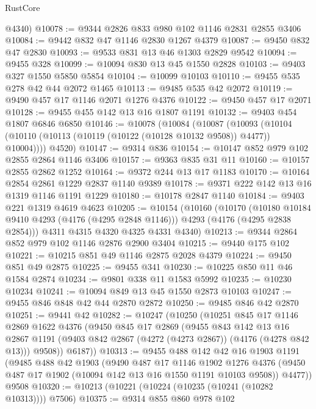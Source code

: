 \begin{lexlean}{RustCore}
\begin{coremodule}
      @4340)
@10078 := @9344 @2826 @833 @980 @102 @1146 @2831 @2855 @3406
@10084 := @9442 @832 @47 @1146 @2830 @1267 @4379
@10087 := @9450 @832 @47 @2830
@10093 := @9533 @831 @13 @46 @1303 @2829 @9542
@10094 := @9455 @328
@10099 := @10094 @830 @13 @45 @1550 @2828
@10103 := @9403 @327 @1550 @5850 @5854
@10104 := @10099 @10103
@10110 := @9455 @535 @278 @42 @44 @2072 @1465
@10113 := @9485 @535 @42 @2072
@10119 := @9490 @457 @17 @1146 @2071 @1276 @4376
@10122 := @9450 @457 @17 @2071
@10128 := @9455 @455 @142 @13 @16 @1807 @1191
@10132 := @9403 @454 @1807 @6846 @6850
@10146 := @10078
    (@10084
      (@10087
        (@10093 (@10104 (@10110 (@10113 (@10119 (@10122 (@10128 @10132 @9508)) @4477)) @10004))))
      @4520)
@10147 := @9314 @836
@10154 := @10147 @852 @979 @102 @2855 @2864 @1146 @3406
@10157 := @9363 @835 @31 @11
@10160 := @10157 @2855 @2862 @1252
@10164 := @9372 @244 @13 @17 @1183
@10170 := @10164 @2854 @2861 @1229 @2837 @1140 @9389
@10178 := @9371 @222 @142 @13 @16 @1319 @1146 @1191 @1229
@10180 := @10178 @2847 @1140
@10184 := @9403 @221 @1319 @4619 @4623
@10205 := @10154
    (@10160
      (@10170
        (@10180 @10184 @9410 @4293 (@4176 (@4295 @2848 @1146)))
        @4293
        (@4176 (@4295 @2838 @2854)))
      @4311
      @4315
      @4320
      @4325
      @4331
      @4340)
@10213 := @9344 @2864 @852 @979 @102 @1146 @2876 @2900 @3404
@10215 := @9440 @175 @102
@10221 := @10215 @851 @49 @1146 @2875 @2028 @4379
@10224 := @9450 @851 @49 @2875
@10225 := @9455 @341
@10230 := @10225 @850 @11 @46 @1584 @2874
@10234 := @9801 @338 @11 @1583 @5992
@10235 := @10230 @10234
@10241 := @10094 @849 @13 @45 @1550 @2873 @10103
@10247 := @9455 @846 @848 @42 @44 @2870 @2872
@10250 := @9485 @846 @42 @2870
@10251 := @9441 @42
@10282 := @10247
    (@10250
      (@10251
        @845
        @17
        @1146
        @2869
        @1622
        @4376
        (@9450
          @845
          @17
          @2869
          (@9455
            @843
            @142
            @13
            @16
            @2867
            @1191
            (@9403 @842 @2867 (@4272 (@4273 @2867)) (@4176 (@4278 @842 @13)))
            @9508))
        @6187))
@10313 := @9455
    @488
    @142
    @42
    @16
    @1903
    @1191
    (@9485
      @488
      @42
      @1903
      (@9490
        @487
        @17
        @1146
        @1902
        @1276
        @4376
        (@9450 @487 @17 @1902 (@10094 @142 @13 @16 @1550 @1191 @10103 @9508))
        @4477))
    @9508
@10320 := @10213 (@10221 (@10224 (@10235 (@10241 (@10282 @10313)))) @7506)
@10375 := @9314
    @855
    @860
    @978
    @102

\end{coremodule}
\end{lexlean}
